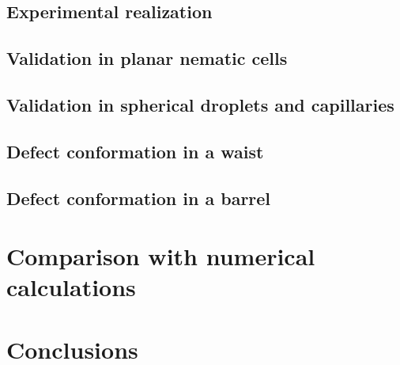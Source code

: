 \subsection{Experimental realization}
\subsection{Validation in planar nematic cells}
\subsection{Validation in spherical droplets and capillaries}
\subsection{Defect conformation in a waist}
\subsection{Defect conformation in a barrel}

\section{Comparison with numerical calculations}

\section{Conclusions}
